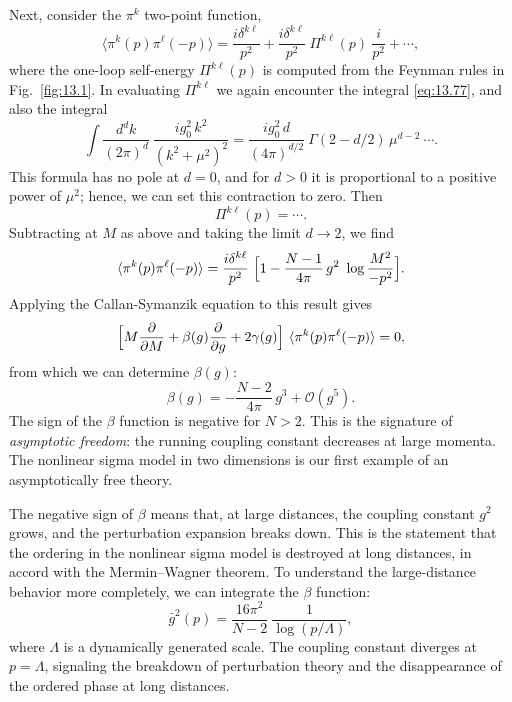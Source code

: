 Next, consider the $\pi^k$ two-point function,
\begin{equation}
  \langle\pi^k(p)\pi^\ell(-p)\rangle = \frac{i\delta^{k\ell}}{p^2}
    + \frac{i\delta^{k\ell}}{p^2}\ \Pi^{k\ell}(p)\ \frac{i}{p^2} + \cdots ,
  \label{eq:13.81}
\end{equation}
where the one-loop self-energy $\Pi^{k\ell}(p)$ is computed from the Feynman
rules in Fig.~\ref{fig:13.1}.  In evaluating $\Pi^{k\ell}$ we again encounter
the integral \eqref{eq:13.77}, and also the integral
\begin{equation}
  \int \frac{d^dk}{(2\pi)^d}\ \frac{i g_0^2\,k^2}{(k^2+\mu^2)^2}
  = \frac{i g_0^2\,d}{(4\pi)^{d/2}}\ \Gamma(2-d/2)\,\mu^{d-2}\ \cdots .
  \label{eq:13.82}
\end{equation}
This formula has no pole at $d = 0$, and for $d > 0$ it is proportional to a
positive power of $\mu^2$; hence, we can set this contraction to zero.  Then
\begin{equation}
  \Pi^{k\ell}(p) = \cdots .
  \label{eq:13.83}
\end{equation}
Subtracting at $M$ as above and taking the limit $d\to 2$, we find
\begin{equation}
  \langle\pi^k(p)\pi^\ell(-p)\rangle = \frac{i\delta^{k\ell}}{p^2}\ \Bigl[
    1 - \frac{N-1}{4\pi}\,g^2\ \log\frac{M^2}{-p^2} \Bigr] .
  \label{eq:13.84}
\end{equation}
Applying the Callan-Symanzik equation to this result gives
\begin{equation}
  \Bigl[ M\frac{\partial}{\partial M} + \beta(g)\frac{\partial}{\partial g}
    + 2\gamma(g) \Bigr]\ \langle\pi^k(p)\pi^\ell(-p)\rangle = 0 ,
\end{equation}
from which we can determine $\beta(g)$:
\begin{equation}
  \beta(g) = -\frac{N-2}{4\pi}\,g^3 + \mathcal{O}(g^5) .
  \label{eq:13.86}
\end{equation}
The sign of the $\beta$ function is negative for $N > 2$.  This is the
signature of \emph{asymptotic freedom}: the running coupling constant
decreases at large momenta.  The nonlinear sigma model in two dimensions is
our first example of an asymptotically free theory.

The negative sign of $\beta$ means that, at large distances, the coupling
constant $g^2$ grows, and the perturbation expansion breaks down.  This is
the statement that the ordering in the nonlinear sigma model is destroyed at
long distances, in accord with the Mermin--Wagner theorem.  To understand the
large-distance behavior more completely, we can integrate the $\beta$
function:
\begin{equation}
  \bar{g}^2(p) = \frac{16\pi^2}{N-2}\ \frac{1}{\log(p/\Lambda)} ,
  \label{eq:13.87}
\end{equation}
where $\Lambda$ is a dynamically generated scale.  The coupling constant
diverges at $p = \Lambda$, signaling the breakdown of perturbation theory and
the disappearance of the ordered phase at long distances.

